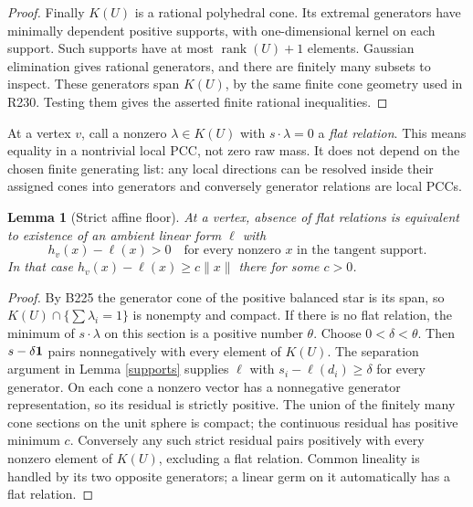 \documentclass[11pt]{article}
\newtheorem{lemma}[theorem]{Lemma}
\begin{document}
\begin{proof}
Finally \(K(U)\) is a rational polyhedral cone. Its extremal generators
have minimally dependent positive supports, with one-dimensional kernel
on each support. Such supports have at most
\(\operatorname{rank}(U)+1\) elements. Gaussian elimination gives rational
generators, and there are finitely many subsets to inspect. These
generators span \(K(U)\), by the same finite cone geometry used in R230.
Testing them gives the asserted finite rational inequalities.
\end{proof}

At a vertex \(v\), call a nonzero \(\lambda\in K(U)\) with
\(s\cdot\lambda=0\) a \emph{flat relation}. This means equality in a
nontrivial local PCC, not zero raw mass. It does not depend on the chosen
finite generating list: any local directions can be resolved inside
their assigned cones into generators and conversely generator relations
are local PCCs.

\begin{lemma}[Strict affine floor]\label{floor}
At a vertex, absence of flat relations is equivalent to existence of an
ambient linear form \(\ell\) with
\[
 h_v(x)-\ell(x)>0\quad
       \text{for every nonzero }x\text{ in the tangent support}.
\]
In that case \(h_v(x)-\ell(x)\geq c\|x\|\) there for some \(c>0\).
\end{lemma}
\begin{proof}
By B225 the generator cone of the positive balanced star is its span,
so \(K(U)\cap\{\sum\lambda_i=1\}\) is nonempty and compact.
If there is no flat relation, the minimum of \(s\cdot\lambda\) on this
section is a positive number \(\theta\). Choose \(0<\delta<\theta\).
Then \(s-\delta{\bf1}\) pairs nonnegatively with every element of \(K(U)\).
The separation argument in Lemma \ref{supports} supplies \(\ell\) with
\(s_i-\ell(d_i)\geq\delta\) for every generator.
On each cone a nonzero vector has a nonnegative generator
representation, so its residual is strictly positive. The union of the
finitely many cone sections on the unit sphere is compact; the continuous
residual has positive minimum \(c\). Conversely any such strict residual
pairs positively with every nonzero element of \(K(U)\), excluding a flat
relation. Common lineality is handled by its two opposite generators;
a linear germ on it automatically has a flat relation.
\end{proof}
\end{document}
